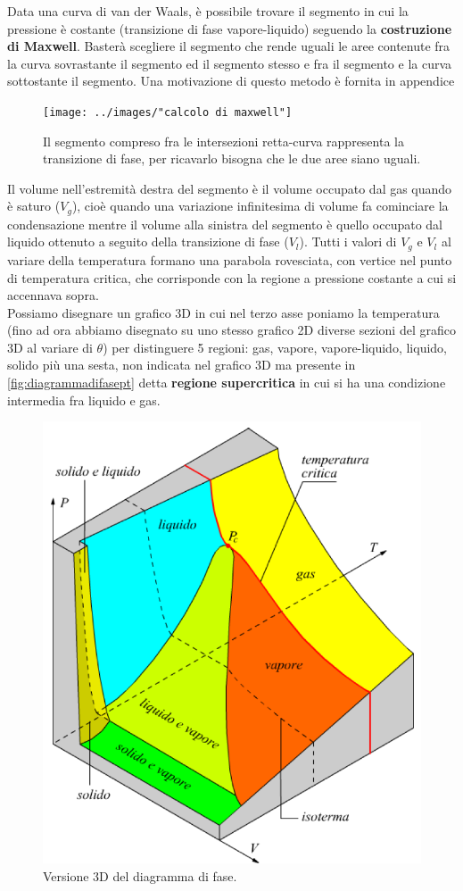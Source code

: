 \documentclass[10pt,a4paper]{article}
\begin{document}
\FloatBarrier
Data una curva di van der Waals, è possibile trovare il segmento in cui la pressione è costante (transizione di fase vapore-liquido) seguendo la \textbf{costruzione di Maxwell}. Basterà scegliere il segmento che rende uguali le aree contenute fra la curva sovrastante il segmento ed il segmento stesso e fra il segmento e la curva sottostante il segmento. Una motivazione di questo metodo è fornita in appendice
\begin{figure}
	\centering
	\texttt{[image: ../images/"calcolo di maxwell"]}
	\caption{Il segmento compreso fra le intersezioni retta-curva rappresenta la transizione di fase, per ricavarlo bisogna che le due aree siano uguali.}
	\label{fig:calcolo-di-maxwell}
\end{figure}
\FloatBarrier 
Il volume nell'estremità destra del segmento è il volume occupato dal gas quando è saturo ($V_g$), cioè quando una variazione infinitesima di volume fa cominciare la condensazione mentre il volume alla sinistra del segmento è quello occupato dal liquido ottenuto a seguito della transizione di fase ($V_l$). Tutti i valori di $V_g$ e $V_l$ al variare della temperatura formano una parabola rovesciata, con vertice nel punto di temperatura critica, che corrisponde con la regione a pressione costante a cui si accennava sopra. \\
Possiamo disegnare un grafico 3D in cui nel terzo asse poniamo la temperatura (fino ad ora abbiamo disegnato su uno stesso grafico 2D diverse sezioni del grafico 3D al variare di $\theta$) per distinguere 5 regioni: gas, vapore, vapore-liquido, liquido, solido più una sesta, non indicata nel grafico 3D ma presente in \ref{fig:diagrammadifasept} detta \textbf{regione supercritica} in cui si ha una condizione intermedia fra liquido e gas.  
\begin{figure}[h!]
	\centering
	\includegraphics[width=0.5\linewidth]{../images/diagrammadifase3D}
	\caption{Versione 3D del diagramma di fase.}
	\label{fig:diagrammadifase3d}
\end{figure}
\FloatBarrier
\end{document}
